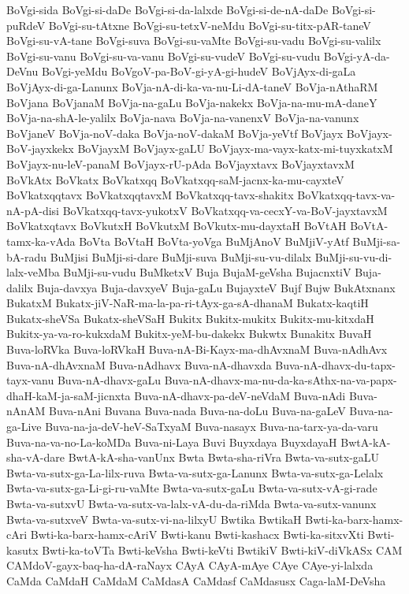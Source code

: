 {BoVgi-sida
BoVgi-si-daDe
BoVgi-si-da-lalxde
BoVgi-si-de-nA-daDe
BoVgi-si-puRdeV
BoVgi-su-tAtxne
BoVgi-su-tetxV-neMdu
BoVgi-su-titx-pAR-taneV
BoVgi-su-vA-tane
BoVgi-suva
BoVgi-su-vaMte
BoVgi-su-vadu
BoVgi-su-valilx
BoVgi-su-vanu
BoVgi-su-va-vanu
BoVgi-su-vudeV
BoVgi-su-vudu
BoVgi-yA-da-DeVnu
BoVgi-yeMdu
BoVgoV-pa-BoV-gi-yA-gi-hudeV
BoVjAyx-di-gaLa
BoVjAyx-di-ga-Lanunx
BoVja-nA-di-ka-va-nu-Li-dA-taneV
BoVja-nAthaRM
BoVjana
BoVjanaM
BoVja-na-gaLu
BoVja-nakekx
BoVja-na-mu-mA-daneY
BoVja-na-shA-le-yalilx
BoVja-nava
BoVja-na-vanenxV
BoVja-na-vanunx
BoVjaneV
BoVja-noV-daka
BoVja-noV-dakaM
BoVja-yeVtf
BoVjayx
BoVjayx-BoV-jayxkekx
BoVjayxM
BoVjayx-gaLU
BoVjayx-ma-vayx-katx-mi-tuyxkatxM
BoVjayx-nu-leV-panaM
BoVjayx-rU-pAda
BoVjayxtavx
BoVjayxtavxM
BoVkAtx
BoVkatx
BoVkatxqq
BoVkatxqq-saM-jacnx-ka-mu-cayxteV
BoVkatxqqtavx
BoVkatxqqtavxM
BoVkatxqq-tavx-shakitx
BoVkatxqq-tavx-va-nA-pA-disi
BoVkatxqq-tavx-yukotxV
BoVkatxqq-va-cecxY-va-BoV-jayxtavxM
BoVkatxqtavx
BoVkutxH
BoVkutxM
BoVkutx-mu-dayxtaH
BoVtAH
BoVtA-tamx-ka-vAda
BoVta
BoVtaH
BoVta-yoVga
BuMjAnoV
BuMjiV-yAtf
BuMji-sa-bA-radu
BuMjisi
BuMji-si-dare
BuMji-suva
BuMji-su-vu-dilalx
BuMji-su-vu-di-lalx-veMba
BuMji-su-vudu
BuMketxV
Buja
BujaM-geVsha
BujacnxtiV
Buja-dalilx
Buja-davxya
Buja-davxyeV
Buja-gaLu
BujayxteV
Bujf
Bujw
BukAtxnanx
BukatxM
Bukatx-jiV-NaR-ma-la-pa-ri-tAyx-ga-sA-dhanaM
Bukatx-kaqtiH
Bukatx-sheVSa
Bukatx-sheVSaH
Bukitx
Bukitx-mukitx
Bukitx-mu-kitxdaH
Bukitx-ya-va-ro-kukxdaM
Bukitx-yeM-bu-dakekx
Bukwtx
Bunakitx
BuvaH
Buva-loRVka
Buva-loRVkaH
Buva-nA-Bi-Kayx-ma-dhAvxnaM
Buva-nAdhAvx
Buva-nA-dhAvxnaM
Buva-nAdhavx
Buva-nA-dhavxda
Buva-nA-dhavx-du-tapx-tayx-vanu
Buva-nA-dhavx-gaLu
Buva-nA-dhavx-ma-nu-da-ka-sAthx-na-va-papx-dhaH-kaM-ja-saM-jicnxta
Buva-nA-dhavx-pa-deV-neVdaM
Buva-nAdi
Buva-nAnAM
Buva-nAni
Buvana
Buva-nada
Buva-na-doLu
Buva-na-gaLeV
Buva-na-ga-Live
Buva-na-ja-deV-heV-SaTxyaM
Buva-nasayx
Buva-na-tarx-ya-da-varu
Buva-na-va-no-La-koMDa
Buva-ni-Laya
Buvi
Buyxdaya
BuyxdayaH
BwtA-kA-sha-vA-dare
BwtA-kA-sha-vanUnx
Bwta
Bwta-sha-riVra
Bwta-va-sutx-gaLU
Bwta-va-sutx-ga-La-lilx-ruva
Bwta-va-sutx-ga-Lanunx
Bwta-va-sutx-ga-Lelalx
Bwta-va-sutx-ga-Li-gi-ru-vaMte
Bwta-va-sutx-gaLu
Bwta-va-sutx-vA-gi-rade
Bwta-va-sutxvU
Bwta-va-sutx-va-lalx-vA-du-da-riMda
Bwta-va-sutx-vanunx
Bwta-va-sutxveV
Bwta-va-sutx-vi-na-lilxyU
Bwtika
BwtikaH
Bwti-ka-barx-hamx-cAri
Bwti-ka-barx-hamx-cAriV
Bwti-kanu
Bwti-kashacx
Bwti-ka-sitxvXti
Bwti-kasutx
Bwti-ka-toVTa
Bwti-keVsha
Bwti-keVti
BwtikiV
Bwti-kiV-diVkASx
CAM
CAMdoV-gayx-baq-ha-dA-raNayx
CAyA
CAyA-mAye
CAye
CAye-yi-lalxda
CaMda
CaMdaH
CaMdaM
CaMdasA
CaMdasf
CaMdasusx
Caga-laM-DeVsha
}
